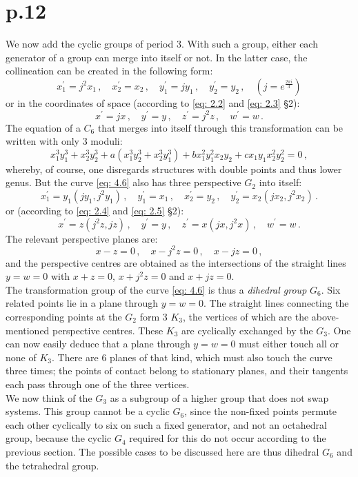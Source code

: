 \documentclass[leqno]{article}
\begin{document}
\section{p.12}
We now add the cyclic groups of period 3. With such a group, either each generator of a group can merge into itself or not. In the latter case, the collineation can be created in the following form: 
\[
x_1^\prime = j^2 x_1 \, , \quad x_2^\prime = x_2 \, , \quad y_1^\prime = j y_1 \, , \quad y_2^\prime = y_2 \, , \quad \left( j = e^{\frac{2 \pi i}{3}} \right)
\] 
or in the coordinates of space (according to \eqref{eq: 2.2} and \eqref{eq: 2.3} \S 2):
\[
x^\prime = jx \, , \quad y^\prime = y \, , \quad z^\prime = j^2 z \, , \quad w^\prime = w \, . 
\]
The equation of a $C_6$ that merges into itself through this transformation can be written with only 3 moduli:
\begin{equation}\label{eq: 4.6}
x_1^3 y_1^3 + x_2^3 y_2^3 + a(x_1^3 y_2^3 + x_2^3 y_1^3) + b x_1^2 y_1^2 x_2 y_2 + c x_1 y_1 x_2^2 y_2^2 = 0 \, , \tag{6}
\end{equation}
whereby, of course, one disregards structures with double points and thus lower genus. But the curve \eqref{eq: 4.6} also has three perspective $G_2$ into itself: 
\[      
x_1^\prime = y_1 (j y_1 , j^2 y_1) \, , \quad y_1^\prime = x_1 \, , \quad x_2^\prime = y_2 \, , \quad y_2^\prime = x_2 (j x_2, j^2 x_2) \, .  
\]
or (according to \eqref{eq: 2.4} and \eqref{eq: 2.5} \S 2):
\[
x^\prime = z(j^2z, jz) \, , \quad y^\prime = y \, , \quad z^\prime = x(jx, j^2x) \, , \quad w^\prime = w \, . 
\]
The relevant perspective planes are: 
\[
x-z=0 \, , \quad x-j^2z=0 \, , \quad x-jz=0 \, , 
\] 
and the perspective centres are obtained as the intersections of the straight lines $y=w=0$ with $x+z=0$, $x+j^2z=0$ and $x+jz=0 $. \\
The transformation group of the curve \eqref{eq: 4.6} is thus a \textit{dihedral group} $G_6$. Six related points lie in a plane through $y=w=0$. The straight lines connecting the corresponding points at the $G_2$ form 3 $K_3$, the vertices of which are the above-mentioned perspective centres. These $K_3$ are cyclically exchanged by the $G_3$. One can now easily deduce that a plane through $y=w=0$ must either touch all or none of $K_3$. There are 6 planes of that kind, which must also touch the curve three times; the points of contact belong to stationary planes, and their tangents each pass through one of the three vertices. \\
We now think of the $G_3$ as a subgroup of a higher group that does not swap systems. This group cannot be a cyclic $G_6$, since the non-fixed points permute each other cyclically to six on such a fixed generator, and not an octahedral group, because the cyclic $G_4$ required for this do not occur according to the previous section. The possible cases to be discussed here are thus dihedral $G_6$ and the tetrahedral group. \\
\end{document}
